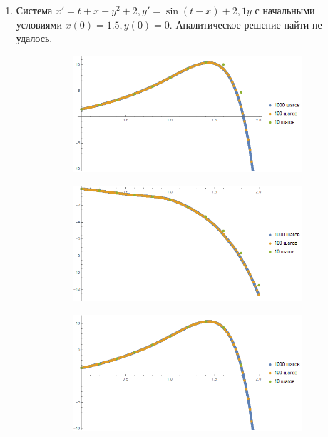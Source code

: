 \documentclass[a4paper,12pt,titlepage,finall]{article}
\begin{document}
\begin{enumerate}
\newpage
\item
Система $x' = t + x - y^2 +2, y' = \sin(t - x) + 2,1 y$ с начальными условиями $x(0) = 1.5, y(0)= 0$. Аналитическое решение найти не удалось.
\begin{figure}[h]
\centering
\begin{subfigure}{.5\textwidth}
  \centering
  \includegraphics[width=\textwidth]{test_1_7_2_x.png}
\end{subfigure}%
\begin{subfigure}{.5\textwidth}
  \centering
  \includegraphics[width=\textwidth]{test_1_7_2_y.png}
\end{subfigure}
\caption{Второй порядок точности, графики $x(t)$ и $y(t)$ соответственно}
\centering
\begin{subfigure}{.5\textwidth}
  \centering
  \includegraphics[width=\textwidth]{test_1_7_4_x.png}

\end{subfigure}
\end{figure}
\end{enumerate}
\end{document}
